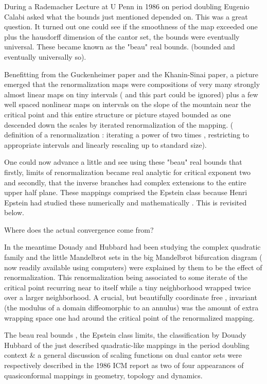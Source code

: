 \begin{description}
 During a  Rademacher Lecture  at U Penn in 1986 on period doubling Eugenio Calabi asked  what the bounds just mentioned depended on. This was a  great question. It turned out  one could see  if the smoothness of the map exceeded one plus the hausdorff dimension of the cantor set, the bounds were eventually universal.
These became known as the "beau" real bounds.
(bounded and eventually universally so).

  Benefitting  from the Guckenheimer paper and the Khanin-Sinai paper, a picture emerged that the renormalization  maps  were compositions of  very many strongly almost linear maps on tiny intervals ( and this part could be  ignored) plus a few well spaced  nonlinear maps on intervals on the slope of the mountain near the critical point and this entire structure or picture stayed bounded as one descended down the scales  by  iterated renormalization of the mapping.
(  definition of a renormalization :  iterating a power of two times , restricting to  appropriate intervals  and linearly rescaling up to standard size).

One could  now  advance a little and see  using  these  "beau" real bounds that  firstly, limits of renormalization became real analytic for critical exponent two and secondly, that the inverse branches had complex extensions to the entire upper half plane. These  mappings comprised  the Epstein class because Henri Epstein had studied these numerically and mathematically . This is revisited below.


 Where does the  actual convergence come from?

In the meantime  Douady and  Hubbard  had been studying  the complex quadratic family and the little Mandelbrot sets in the  big Mandelbrot bifurcation diagram ( now readily available using computers) were explained by them to be the effect of renormalization. This  renormalization   being  associated to some  iterate of the critical point  recurring near to itself while a tiny neighborhood wrapped  twice over  a larger neighborhood.
 A crucial, but beautifully coordinate free , invariant (the modulus of a domain diffeomorphic to an annulus) was the amount of extra wrapping space one had around the critical point of the renormalized mapping.

The  beau real  bounds , the Epstein class limits, the classification by
Douady Hubbard of the just described quadratic-like mappings in the
period doubling context  \&  a general discussion of scaling functions on
dual cantor sets were respectively described in  the 1986 ICM  report  as
two  of four appearances of  quasiconformal mappings  in geometry,
topology and dynamics.


\end{description}
